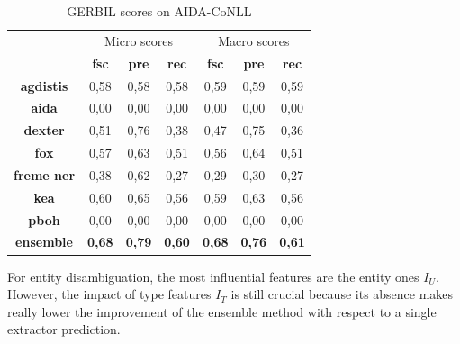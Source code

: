 \documentclass{llncs}
\begin{document}
 \begin{table}
      \centering
      \setlength{\tabcolsep}{12pt}
        \begin{tabular}{c|c|c|c|c|c|c|}
          \multicolumn{1}{c}{ } &
          \multicolumn{3}{|c|}{Micro scores} & 
          \multicolumn{3}{|c|}{Macro scores} \\
           \multicolumn{1}{c|}{ } & \textbf{fsc} & \textbf{pre} & \textbf{rec}
           & \textbf{fsc} & \textbf{pre} & \textbf{rec} \\ \hline
            \textbf{agdistis}         & 0,58  & 0,58   & 0,58  &  0,59  & 0,59   & 0,59  \\ \hline
            \textbf{aida}         & 0,00  & 0,00   & 0,00  &   0,00  & 0,00   & 0,00   \\ \hline
            \textbf{dexter}         & 0,51  & 0,76   & 0,38  &   0,47  & 0,75   & 0,36   \\ \hline
            \textbf{fox}         & 0,57  & 0,63   & 0,51  & 0,56  & 0,64   & 0,51   \\ \hline
            \textbf{freme ner}         & 0,38  & 0,62   & 0,27  &   0,29  & 0,30   & 0,27   \\ \hline
            \textbf{kea}          & 0,60  & 0,65   & 0,56  &   0,59  & 0,63   & 0,56  \\ \hline
            \textbf{pboh}         & 0,00  & 0,00   & 0,00  &   0,00  & 0,00   & 0,00   \\ \hline \hline
            \textbf{ensemble}        & \textbf{0,68}   & \textbf{0,79}   & \textbf{0,60} & \textbf{0,68}   & \textbf{0,76}   & \textbf{0,61}  \\ \hline
        \end{tabular}
    \caption{GERBIL scores on AIDA-CoNLL}
    \label{linkscoresgerbilaida}
\end{table}







For entity disambiguation, the most influential features are the entity ones \textit{$I_U$}. However, the impact of type features \textit{$I_T$} is still crucial because its absence makes really lower the improvement of the ensemble method with respect to a single extractor prediction.

\end{document}
